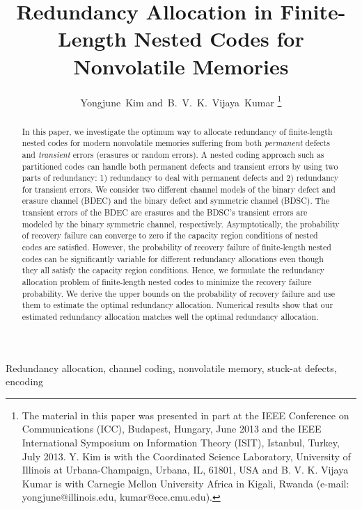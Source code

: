 \documentclass[10pt,twocolumn,twoside,submit]{JCNtran}
\begin{document}
\title{Redundancy Allocation in Finite-Length Nested Codes for Nonvolatile Memories}

\author{Yongjune~Kim and~B.~V.~K.~Vijaya~Kumar
\thanks{The material in this paper was presented in part at the IEEE Conference on Communications (ICC), Budapest, Hungary, June 2013 and the IEEE International Symposium on Information Theory (ISIT), Istanbul, Turkey, July 2013.
Y. Kim is with the Coordinated Science Laboratory, University of Illinois at Urbana-Champaign, Urbana, IL, 61801, USA and B. V. K. Vijaya Kumar is with Carnegie Mellon University Africa in Kigali, Rwanda (e-mail: yongjune@illinois.edu, kumar@ece.cmu.edu).}
}
\maketitle

\begin{abstract}
	In this paper, we investigate the optimum way to allocate redundancy of finite-length nested codes for modern nonvolatile memories suffering from both \emph{permanent} defects and \emph{transient} errors (erasures or random errors). A nested coding approach such as partitioned codes can handle both permanent defects and transient errors by using two parts of redundancy: 1) redundancy to deal with permanent defects and 2) redundancy for transient errors. We consider two different channel models of the binary defect and erasure channel (BDEC) and the binary defect and symmetric channel (BDSC). The transient errors of the BDEC are erasures and the BDSC's transient errors are modeled by the binary symmetric channel, respectively. Asymptotically, the probability of recovery failure can converge to zero if the capacity region conditions of nested codes are satisfied. However, the probability of recovery failure of finite-length nested codes can be significantly variable for different redundancy allocations even though they all satisfy the capacity region conditions. Hence, we formulate the redundancy allocation problem of finite-length nested codes to minimize the recovery failure probability. We derive the upper bounds on the probability of recovery failure and use them to estimate the optimal redundancy allocation. Numerical results show that our estimated redundancy allocation matches well the optimal redundancy allocation.
\end{abstract}

\begin{keywords}
	Redundancy allocation, channel coding, nonvolatile memory, stuck-at defects, encoding
\end{keywords}
\end{document}
